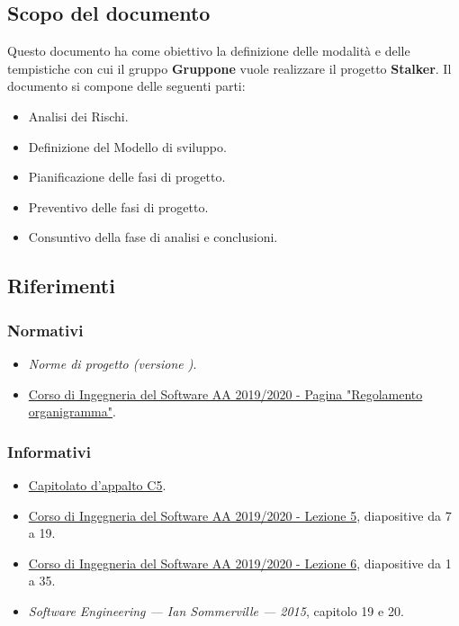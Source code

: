 \documentclass[../piano-di-progetto.tex]{subfiles}
\begin{document}
\subsection{Scopo del documento}%
\label{sub:scopo_del_documento}
Questo documento ha come obiettivo la definizione delle modalità e delle tempistiche con cui il gruppo \textbf{Gruppone} vuole realizzare il progetto \textbf{Stalker}.
Il documento si compone delle seguenti parti:
\begin{itemize}
  \item Analisi dei Rischi.
  \item Definizione del Modello di sviluppo.
  \item Pianificazione delle fasi di progetto.
  \item Preventivo delle fasi di progetto.
  \item Consuntivo della fase di analisi e conclusioni.
\end{itemize}

\scopoDelProdottoEGlossario{}

\subsection{Riferimenti}%
\label{sub:riferimenti}
\subsubsection{Normativi}%
\label{subs:normativi}
\begin{itemize}
  \item \textit{Norme di progetto (versione \versione)}.
  \item \href{https://www.math.unipd.it/~tullio/IS-1/2019/Progetto/RO.html}{Corso di Ingegneria del Software AA 2019/2020 - Pagina "Regolamento organigramma"}.
\end{itemize}
\subsubsection{Informativi}%
\label{subs:informativi}
\begin{itemize}
  \item \href{https://www.math.unipd.it/~tullio/IS-1/2019/Progetto/C5.pdf}{Capitolato d'appalto C5}.
  \item \href{https://www.math.unipd.it/~tullio/IS-1/2019/Dispense/L05.pdf}{Corso di Ingegneria del Software AA 2019/2020 - Lezione 5}, diapositive da 7 a 19.
  \item \href{https://www.math.unipd.it/~tullio/IS-1/2019/Dispense/L06.pdf}{Corso di Ingegneria del Software AA 2019/2020 - Lezione 6}, diapositive da 1 a 35.
  \item \textit{Software Engineering --- Ian Sommerville --- 2015}, capitolo 19 e 20.
\end{itemize}%
\end{document}
